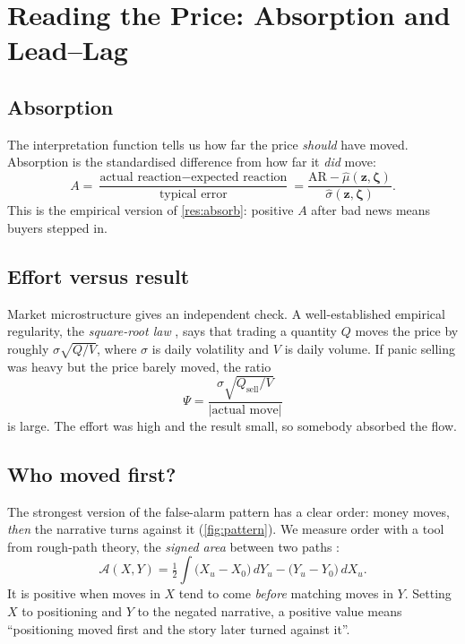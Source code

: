 \documentclass[11pt,a4paper]{article}
\theoremstyle{plain}
\theoremstyle{definition}
\newcommand{\z}{\bm{z}}
\begin{document}
\section{Reading the Price: Absorption and Lead--Lag}\label{sec:absorption}

\subsection{Absorption}

The interpretation function tells us how far the price \emph{should} have moved. Absorption is the standardised difference from how far it \emph{did} move:
\begin{equation}
  A = \frac{\text{actual reaction} - \text{expected reaction}}{\text{typical error}}
    = \frac{\mathrm{AR} - \hat\mu(\z,\bm\zeta)}{\hat\sigma(\z,\bm\zeta)} .
\end{equation}
This is the empirical version of \cref{res:absorb}: positive $A$ after bad news means buyers stepped in.

\subsection{Effort versus result}

Market microstructure gives an independent check. A well-established empirical regularity, the \emph{square-root law} \citep{bouchaud2018}, says that trading a quantity $Q$ moves the price by roughly $\sigma\sqrt{Q/V}$, where $\sigma$ is daily volatility and $V$ is daily volume. If panic selling was heavy but the price barely moved, the ratio
\begin{equation}
  \Psi = \frac{\sigma\sqrt{Q_{\text{sell}}/V}}{|\text{actual move}|}
\end{equation}
is large. The effort was high and the result small, so somebody absorbed the flow.

\subsection{Who moved first?}

The strongest version of the false-alarm pattern has a clear order: money moves, \emph{then} the narrative turns against it (\cref{fig:pattern}). We measure order with a tool from rough-path theory, the \emph{signed area} between two paths \citep{chevyrev2016}:
\begin{equation}
  \mathcal{A}(X,Y) = \tfrac12\int \big(X_u - X_0\big)\,dY_u - \big(Y_u - Y_0\big)\,dX_u .
\end{equation}
It is positive when moves in $X$ tend to come \emph{before} matching moves in $Y$. Setting $X$ to positioning and $Y$ to the negated narrative, a positive value means ``positioning moved first and the story later turned against it''.
\end{document}
